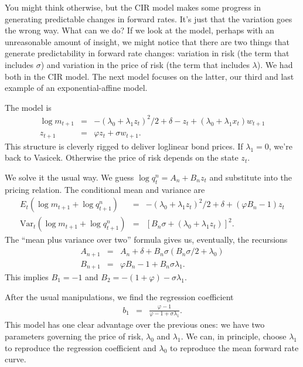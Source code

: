 \documentclass[11pt]{article}
\begin{document}
You might think otherwise, but the CIR model makes some progress in generating
predictable changes in forward rates.
It's just that the variation goes the wrong way.
What can we do?
If we look at the model, perhaps with an unreasonable amount
of insight,
we might notice that there are two things
that generate predictability in forward rate changes:
variation in risk (the term that includes $\sigma$)
and variation in the price of risk (the term that includes $\lambda$).
We had both in the CIR model.
The next model focuses on the latter,
our third and last example of an exponential-affine model.


The model is
\begin{eqnarray*}
    \log m_{t+1} &=& - (\lambda_0 + \lambda_1 z_t)^2/2 + \delta - z_t
            + (\lambda_0 + \lambda_1 x_t) w_{t+1} \\
            z_{t+1} &=& \varphi z_t + \sigma w_{t+1} .
\end{eqnarray*}
This structure is cleverly rigged to deliver loglinear bond prices.
If $\lambda_1 = 0$, we're back to Vasicek.
Otherwise the price of risk depends on the state $z_t$.

We solve it the usual way.
We guess  $ \log q^n_t = A_n + B_n z_t$ and substitute into the
pricing relation.
The conditional mean and variance are
\begin{eqnarray*}
   E_t \left( \log m_{t+1} + \log q^{n}_{t+1} \right) &=&
            - (\lambda_0 + \lambda_1 z_t)^2/2 + \delta + (\varphi B_n -1) z_t  \\
   \mbox{Var}_t \left( \log m_{t+1} + \log q^{n}_{t+1} \right) &=&
            \left[B_n \sigma + (\lambda_0 + \lambda_1 z_t)\right]^2  .
\end{eqnarray*}
The ``mean plus variance over two'' formula gives us, eventually,
the recursions
\begin{eqnarray*}
    A_{n+1} &=& A_n + \delta + B_n \sigma (B_n \sigma/2 + \lambda_0) \\
    B_{n+1} &=& \varphi B_n - 1 + B_n \sigma \lambda_1 .
\end{eqnarray*}
This implies
$B_1 = -1$ and $B_2 = -(1+\varphi) - \sigma \lambda_1 $.


After the usual manipulations,
we find the regression coefficient
\begin{eqnarray*}
    b_1 &=& \frac{\varphi-1}{\varphi-1+\sigma\lambda_1} .
\end{eqnarray*}
This model has one clear advantage over the previous ones:
we have two parameters governing the price of risk,
$\lambda_0$ and $\lambda_1$.
We can, in principle, choose $\lambda_1$ to reproduce
the regression coefficient and $\lambda_0$ to reproduce the
mean forward rate curve.
\end{document}
